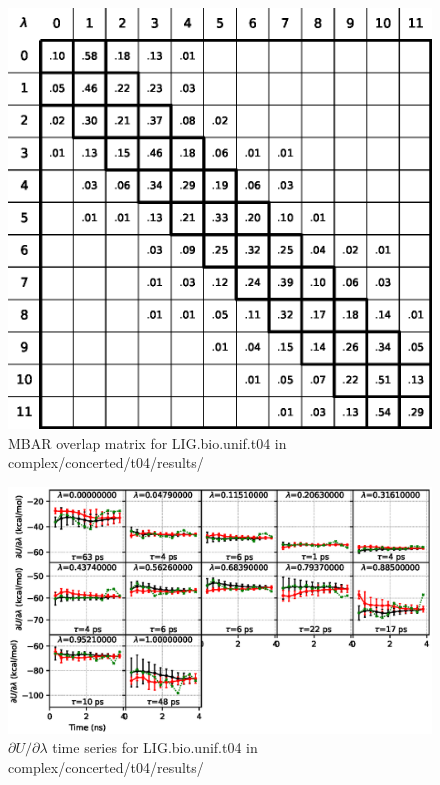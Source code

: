 \documentclass[journal=jctcce,manuscript=article,hyperref=false]{achemso}
\begin{document}
\begin{figure}
\includegraphics[clip,width=6in]{complex.concerted.t04.results..S.eps}\vspace{-0.3cm}
\caption{MBAR overlap matrix for LIG.bio.unif.t04 in complex/concerted/t04/results/}
\end{figure}


\begin{figure}
\includegraphics[clip,width=6in]{complex.concerted.t04.results..DVDLvsT.eps}\vspace{-0.3cm}
\caption{$\partial U/\partial\lambda$ time series for LIG.bio.unif.t04 in complex/concerted/t04/results/}
\end{figure}
\end{document}
